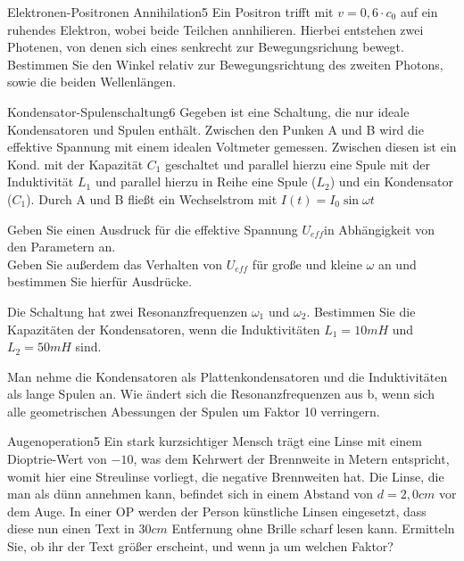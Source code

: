\begin{problem}{Elektronen-Positronen Annihilation}{5}
  Ein Positron trifft mit $v=0,6\cdot c_0$ auf ein ruhendes Elektron, wobei beide Teilchen annhilieren. Hierbei entstehen zwei Photenen, von denen sich eines senkrecht zur Bewegungsrichung bewegt. Bestimmen Sie den Winkel relativ zur Bewegungsrichtung des zweiten Photons, sowie die beiden Wellenlängen.
\end{problem}

\begin{problem}{Kondensator-Spulenschaltung}{6}
Gegeben ist eine Schaltung, die nur ideale Kondensatoren und Spulen enthält. Zwischen den Punken A und B wird die effektive Spannung mit einem idealen Voltmeter gemessen. Zwischen diesen ist ein Kond. mit der Kapazität $C_1$ geschaltet und parallel hierzu eine Spule mit der Induktivität $L_1$ und parallel hierzu in Reihe eine Spule ($L_2$) und ein Kondensator ($C_1$). Durch A und B fließt ein Wechselstrom mit $I(t)=I_0\sin{\omega t}$
\begin{abcenum}
  \item Geben Sie einen Ausdruck für die effektive Spannung $U_{eff}$in Abhängigkeit von den Parametern an.\\ Geben Sie außerdem das Verhalten von $U_{eff}$ für große und kleine $\omega$ an und bestimmen Sie hierfür Ausdrücke.
\item Die Schaltung hat zwei Resonanzfrequenzen $\omega_1$ und $\omega_2$. Bestimmen Sie die Kapazitäten der Kondensatoren, wenn die Induktivitäten $L_1=10\unit{mH}$ und $L_2=50\unit{mH}$ sind.
\item Man nehme die Kondensatoren als Plattenkondensatoren und die Induktivitäten als lange Spulen an. Wie ändert sich die Resonanzfrequenzen aus b, wenn sich alle geometrischen Abessungen der Spulen um Faktor 10 verringern.
\end{abcenum}

\end{problem}

\begin{problem}{Augenoperation}{5}
Ein stark kurzsichtiger Mensch trägt eine Linse mit einem Dioptrie-Wert von $-10$, was dem Kehrwert der Brennweite in Metern entspricht, womit hier eine Streulinse vorliegt, die negative Brennweiten hat. Die Linse, die man als dünn annehmen kann, befindet sich in einem Abstand von $d=2,0\unit{cm}$ vor dem Auge. In einer OP werden der Person künstliche Linsen eingesetzt, dass diese nun einen Text in $30\unit{cm}$ Entfernung ohne Brille scharf lesen kann. Ermitteln Sie, ob ihr der Text größer erscheint, und wenn ja um welchen Faktor?
\end{problem}

